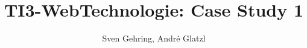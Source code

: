 \documentclass{article}
\begin{document}
\title{TI3-WebTechnologie: Case Study 1}
\author{Sven Gehring, André Glatzl}

\maketitle

\begin{abstract}

\end{abstract}

\clearpage
\tableofcontents
\clearpage
\end{document}
